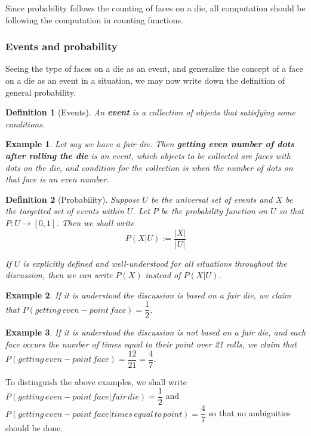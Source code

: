 \documentclass[12pt]{article}
\newtheorem{definition}{Definition}[section]
\newtheorem*{example}{Example}
\begin{document}
    Since probability follows the counting of faces on a die, all computation should be following the computation in counting functions.

    \subsubsection*{Events and probability}

    Seeing the type of faces on a die as an event, and generalize the concept of a face on a die as an event in a situation, we may now write down the definition of general probability.

    \begin{definition}[Events]
        An \textbf{event} is a collection of objects that satisfying some conditions.
    \end{definition}

    \begin{example}
        Let say we have a fair die. Then \textbf{getting even number of dots after rolling the die} is an event, which objects to be collected are faces with dots on the die, and condition for the collection is when the number of dots on that face is an even number.
    \end{example}

    \begin{definition}[Probability]
        Suppose $U$ be the universal set of events and $X$ be the targetted set of events within $U$. Let $P$ be the probability function on $U$ so that $P:U\to [0,1]$. Then we shall write $$P(X|U):=\frac{|X|}{|U|}$$

        If $U$ is explicitly defined and well-understood for all situations throughout the discussion, then we can write $P(X)$ instead of $P(X|U)$.
    \end{definition}

    \begin{example}
        If it is understood the discussion is based on a fair die, we claim that $P(getting\, even-point\, face)=\dfrac{1}{2}$.
    \end{example}

    \begin{example}
        If it is understood the discussion is not based on a fair die, and each face occurs the number of times equal to their point over 21 rolls, we claim that $P(getting\, even-point\, face)=\dfrac{12}{21}=\dfrac{4}{7}$.
    \end{example}

    To distinguish the above examples, we shall write $P(getting\, even-point\, face|fair\, die)=\dfrac{1}{2}$ and $P(getting\, even-point\, face|times\, equal\, to\, point)=\dfrac{4}{7}$ so that no ambiguities should be done.
\end{document}
